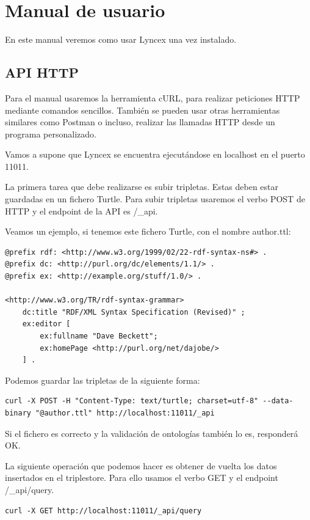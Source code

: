 \documentclass[12pt]{report} %
\begin{document}
\section{Manual de usuario}

En este manual veremos como usar Lyncex una vez instalado. 

\subsection{API HTTP}
Para el manual usaremos la herramienta cURL, para realizar peticiones HTTP mediante comandos sencillos. También se pueden usar otras herramientas similares como Postman o incluso, realizar las llamadas HTTP desde un programa personalizado.

Vamos a supone que Lyncex se encuentra ejecutándose en localhost en el puerto 11011.

La primera tarea que debe realizarse es subir tripletas. Estas deben estar guardadas en un fichero Turtle. Para subir tripletas usaremos el verbo POST de HTTP y el endpoint de la API es /\_api.

Veamos un ejemplo, si tenemos este fichero Turtle, con el nombre author.ttl:

\begin{lstlisting}
@prefix rdf: <http://www.w3.org/1999/02/22-rdf-syntax-ns#> .
@prefix dc: <http://purl.org/dc/elements/1.1/> .
@prefix ex: <http://example.org/stuff/1.0/> .

<http://www.w3.org/TR/rdf-syntax-grammar>
    dc:title "RDF/XML Syntax Specification (Revised)" ;
    ex:editor [
        ex:fullname "Dave Beckett";
        ex:homePage <http://purl.org/net/dajobe/>
    ] .
\end{lstlisting}

Podemos guardar las tripletas de la siguiente forma:
\begin{verbatim}
curl -X POST -H "Content-Type: text/turtle; charset=utf-8" --data-binary "@author.ttl" http://localhost:11011/_api
\end{verbatim}

Si el fichero es correcto y la validación de ontologías también lo es, responderá OK.

La siguiente operación que podemos hacer es obtener de vuelta los datos insertados en el triplestore. Para ello usamos el verbo GET y el endpoint /\_api/query.

\begin{verbatim}
curl -X GET http://localhost:11011/_api/query
\end{verbatim}
\end{document}
